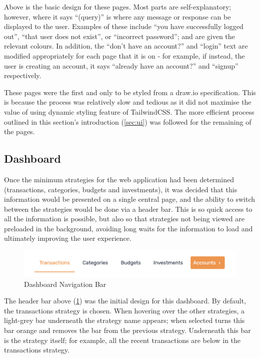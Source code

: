 Above is the basic design for these pages. Most parts are self-explanatory; however, where it says ``(query)'' is where any message or response can be displayed to the user. Examples of these include ``you have successfully logged out'', ``that user does not exist'', or ``incorrect password''; and are given the relevant colours. In addition, the ``don't have an account?'' and ``login'' text are modified appropriately for each page that it is on - for example, if instead, the user is creating an account, it says ``already have an account?'' and ``signup'' respectively.

These pages were the first and only to be styled from a draw.io specification. This is because the process was relatively slow and tedious as it did not maximise the value of using dynamic styling feature of TailwindCSS. The more efficient process outlined in this section's introduction (\ref{sec:ui}) was followed for the remaining of the pages.

\subsection{Dashboard}
Once the minimum strategies for the web application had been determined (transactions, categories, budgets and investments), it was decided that this information would be presented on a single central page, and the ability to switch between the strategies would be done via a header bar. This is so quick access to all the information is possible, but also so that strategies not being viewed are preloaded in the background, avoiding long waits for the information to load and ultimately improving the user experience.

\begin{figure}[H]
	\centering
	\includegraphics[width=\textwidth]{images/header_navigation_bar.png}
	\caption{Dashboard Navigation Bar}
	\label{fig:DashboardNavigationBar}
\end{figure}

The header bar above (\ref{fig:DashboardNavigationBar}) was the initial design for this dashboard. By default, the transactions strategy is chosen. When hovering over the other strategies, a light-grey bar underneath the strategy name appears; when selected turns this bar orange and removes the bar from the previous strategy. Underneath this bar is the strategy itself; for example, all the recent transactions are below in the transactions strategy.

